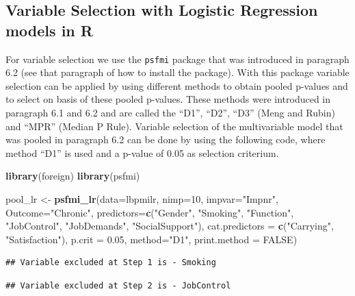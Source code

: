\documentclass[
]{book}
\newenvironment{Shaded}{\begin{snugshade}}{\end{snugshade}}
\newcommand{\DataTypeTok}[1]{\textcolor[rgb]{0.13,0.29,0.53}{#1}}
\newcommand{\DecValTok}[1]{\textcolor[rgb]{0.00,0.00,0.81}{#1}}
\newcommand{\FloatTok}[1]{\textcolor[rgb]{0.00,0.00,0.81}{#1}}
\newcommand{\KeywordTok}[1]{\textcolor[rgb]{0.13,0.29,0.53}{\textbf{#1}}}
\newcommand{\NormalTok}[1]{#1}
\newcommand{\OtherTok}[1]{\textcolor[rgb]{0.56,0.35,0.01}{#1}}
\newcommand{\StringTok}[1]{\textcolor[rgb]{0.31,0.60,0.02}{#1}}
\begin{document}
\hypertarget{variable-selection-with-logistic-regression-models-in-r}{%
\subsection{Variable Selection with Logistic Regression models in R}\label{variable-selection-with-logistic-regression-models-in-r}}

For variable selection we use the \texttt{psfmi} package that was introduced in paragraph 6.2 (see that paragraph of how to install the package). With this package variable selection can be applied by using different methods to obtain pooled p-values and to select on basis of these pooled p-values. These methods were introduced in paragraph 6.1 and 6.2 and are called the ``D1'', ``D2'', ``D3'' (Meng and Rubin) and ``MPR'' (Median P Rule). Variable selection of the multivariable model that was pooled in paragraph 6.2 can be done by using the following code, where method ``D1'' is used and a p-value of 0.05 as selection criterium.

\begin{Shaded}
\begin{Highlighting}[]
\KeywordTok{library}\NormalTok{(foreign)}
\KeywordTok{library}\NormalTok{(psfmi)}

\NormalTok{pool_lr <-}\StringTok{ }\KeywordTok{psfmi_lr}\NormalTok{(}\DataTypeTok{data=}\NormalTok{lbpmilr, }\DataTypeTok{nimp=}\DecValTok{10}\NormalTok{, }\DataTypeTok{impvar=}\StringTok{"Impnr"}\NormalTok{, }\DataTypeTok{Outcome=}\StringTok{"Chronic"}\NormalTok{,}
  \DataTypeTok{predictors=}\KeywordTok{c}\NormalTok{(}\StringTok{"Gender"}\NormalTok{, }\StringTok{"Smoking"}\NormalTok{, }\StringTok{"Function"}\NormalTok{, }\StringTok{"JobControl"}\NormalTok{, }\StringTok{"JobDemands"}\NormalTok{,}
  \StringTok{"SocialSupport"}\NormalTok{), }\DataTypeTok{cat.predictors =} \KeywordTok{c}\NormalTok{(}\StringTok{"Carrying"}\NormalTok{, }\StringTok{"Satisfaction"}\NormalTok{), }
  \DataTypeTok{p.crit =} \FloatTok{0.05}\NormalTok{, }\DataTypeTok{method=}\StringTok{"D1"}\NormalTok{, }\DataTypeTok{print.method =} \OtherTok{FALSE}\NormalTok{)}
\end{Highlighting}
\end{Shaded}

\begin{verbatim}
## Variable excluded at Step 1 is - Smoking
\end{verbatim}

\begin{verbatim}
## Variable excluded at Step 2 is - JobControl
\end{verbatim}
\end{document}
